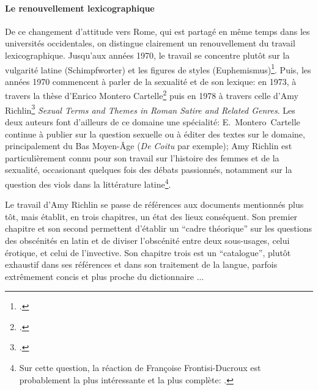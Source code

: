 
\paragraph{Le renouvellement lexicographique}

De ce changement d'attitude vers Rome, qui est partagé en même temps dans les universités occidentales, on distingue clairement un renouvellement du travail lexicographique. %
Jusqu'aux années 1970, le travail se concentre plutôt sur la vulgarité latine (Schimpfworter) et les figures de styles (Euphemismus)\footcite{opelt1966euphemismus}. Puis, les années 1970 commencent à parler de la sexualité et de son lexique: en 1973, à travers la thèse d'Enrico Montero Cartelle\footcite{montero_cartelle_aspectos_1973} puis en 1978 à travers celle d'Amy Richlin\footcite{richlin_sexual_1978} \textit{Sexual Terms and Themes in Roman Satire and Related Genres}. Les deux auteurs font d'ailleurs de ce domaine une spécialité: E.~Montero~Cartelle continue à publier sur la question sexuelle ou à éditer des textes sur le domaine, principalement du Bas Moyen-Âge (\textit{De Coitu} par exemple); Amy Richlin est particulièrement connu pour son travail sur l'histoire des femmes et de la sexualité, occasionant quelques fois des débats passionnés, notamment sur la question des viols dans la littérature latine\footnote{Sur cette question, la réaction de Françoise Frontisi-Ducroux est probablement la plus intéressante et la plus complète: \textcite{frontisi2004ovide}.}. 

Le travail d'Amy Richlin se passe de références aux documents mentionnés plus tôt, mais établit, en trois chapitres, un état des lieux conséquent. Son premier chapitre et son second permettent d'établir un \enquote{cadre théorique} sur les questions des obscénités en latin et de diviser l'obscénité entre deux sous-usages, celui érotique, et celui de l'invective. Son chapitre trois est un \enquote{catalogue}, plutôt exhaustif dans ses références et dans son traitement de la langue, parfois extrêmement concis et plus proche du dictionnaire ... %



